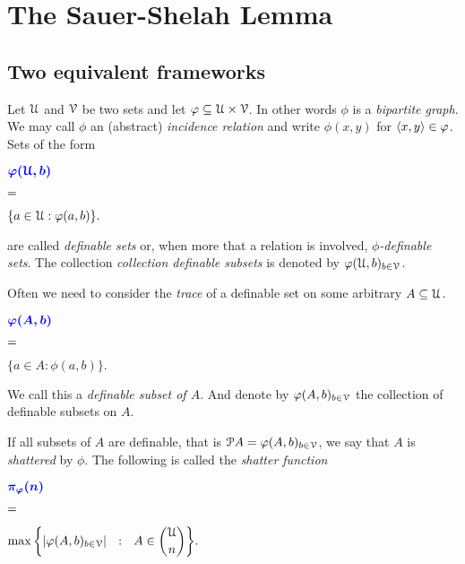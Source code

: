 \documentclass[sputnik.tex]{subfiles}
\begin{document}
\chapter{The Sauer-Shelah Lemma}
\label{sauer}

\def\vc{{\footnotesize VC}}
\def\nip{{\footnotesize NIP}}


\def\medrel#1{\parbox[t]{6ex}{$\displaystyle\hfil #1$}}
\def\ceq#1#2#3{\parbox[t]{25ex}{$\displaystyle #1$}\medrel{#2}{$\displaystyle #3$}}

\def\mr{\color{brown}}
\def\gr{\color{green}}

\section{Two equivalent frameworks}\label{vc_dimension}

Let $\EuScript U$ and $\EuScript V$ be two sets and let $\varphi\subseteq \EuScript U\times\EuScript V$.
In other words $\phi$ is a \emph{bipartite graph}.
We may call $\phi$ an (abstract) \emph{incidence relation\/} and write $\phi(x,y)$ for $\langle x,y\rangle\in\varphi$.
Sets of the form

\ceq{\hfill\emph{$\phi(\U,b)$}}{=}{\{a\in\U:\phi(a,b)\}.}

are called \emph{definable sets\/} or, when more that a relation is involved, \emph{$\phi$-definable sets}.
The collection \emph{collection definable subsets\/} is denoted by \emph{$\varphi(\EuScript U,b)_{b\in\EuScript V}$}.

Often we need to consider the \emph{trace\/} of a definable set on some arbitrary $A\subseteq\EuScript U$.

\ceq{\hfill\emph{$\phi(A,b)$}}{=}{\{a\in A:\phi(a,b)\}.}

We call this a \emph{definable subset of $A$}.
And denote by \emph{$\varphi(A,b)_{b\in\EuScript V}$\/} the collection of definable subsets on $A$.

If all subsets of $A$ are definable, that is $\EuScript P A=\varphi(A,b)_{b\in\EuScript V}$, we say that $A$ is \emph{shattered\/} by $\phi$.
The following is called the \emph{shatter function\/}


\ceq{\hfill\emph{$\pi_\phi(n)$}}{=}{\max\bigg\{|\phi(A,b)_{b\in\V}|\ \ :\ \ A\in {\U\choose n}\bigg\}.}
\end{document}
